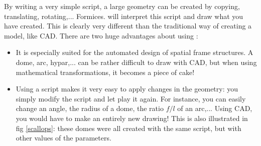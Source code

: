 {By writing a very simple script, a large geometry can be created by copying, translating, rotating,... Formices. \pyformex will interpret this script and draw what you have created. This is clearly very different than the traditional way of creating a model, like CAD. There are two huge advantages about using \pyformex:
\begin{itemize}
\item It is especially suited for the automated design of spatial frame structures. A dome, arc, hypar,... can be rather difficult to draw with CAD, but when using mathematical transformations, it becomes a piece of cake!
\item Using a script makes it very easy to apply changes in the geometry: you simply modify the script and let \pyformex play it again. For instance, you can easily change an angle, the radius of a dome, the ratio $f/l$ of an arc,... Using CAD, you would have to make an entirely new drawing! This is also illustrated in fig \ref{scallops}: these domes were all created with the same script, but with other values of the parameters.
\end{itemize}
\begin{figure}[tbp,h]
  \centering
  \begin{makeimage}
  \end{makeimage}
  \begin{latexonly}
    \hfill
    \hfill

\end{latexonly}
\end{figure}}
